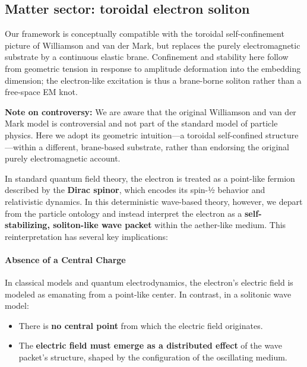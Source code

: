 \subsection{Matter sector: toroidal electron soliton}
\label{internal-structure-of-the-electron}

Our framework is conceptually compatible with the toroidal self-confinement picture
of Williamson and van der Mark, but replaces the purely electromagnetic substrate by
a continuous elastic brane. Confinement and stability here follow from geometric
tension in response to amplitude deformation into the embedding dimension; the
electron-like excitation is thus a brane-borne soliton rather than a free-space EM knot.

\textbf{Note on controversy:} We are aware that the original Williamson and van der Mark model is controversial and not part of the standard model of particle physics. Here we adopt its geometric intuition—a toroidal self-confined structure—within a different, brane-based substrate, rather than endorsing the original purely electromagnetic account.

In standard quantum field theory, the electron is treated as a
point-like fermion described by the \textbf{Dirac spinor}, which encodes
its spin-½ behavior and relativistic dynamics. In this deterministic
wave-based theory, however, we depart from the particle ontology and
instead interpret the electron as a \textbf{self-stabilizing,
soliton-like wave packet} within the aether-like medium. This
reinterpretation has several key implications:

\paragraph{Absence of a Central
Charge}\label{absence-of-a-central-charge}

In classical models and quantum electrodynamics, the electron's electric
field is modeled as emanating from a point-like center. In contrast, in
a solitonic wave model:

\begin{itemize}
\tightlist
\item
  There is \textbf{no central point} from which the electric field
  originates.
\item
  The \textbf{electric field must emerge as a distributed effect} of the
  wave packet's structure, shaped by the configuration of the
  oscillating medium.
\end{itemize}

